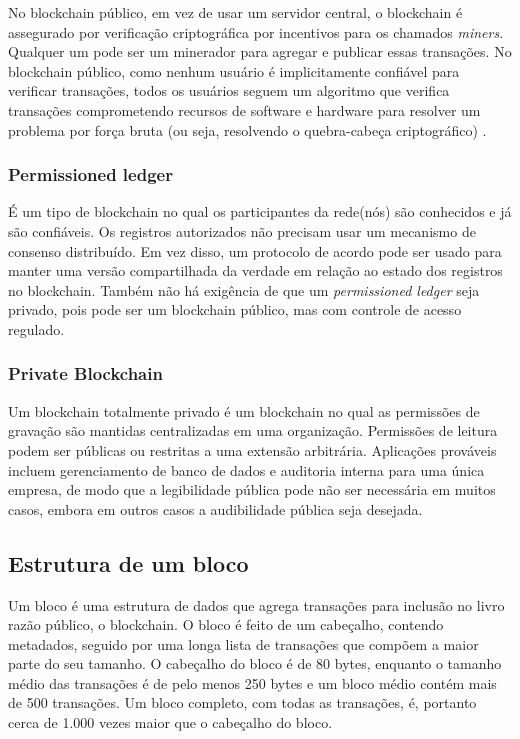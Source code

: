     No blockchain público, em vez de usar um servidor central, o blockchain é assegurado por verificação criptográfica por incentivos para os chamados \textit{miners}. Qualquer um pode ser um minerador para agregar e publicar essas transações. No blockchain público, como nenhum usuário é implicitamente confiável para verificar transações, todos os usuários seguem um algoritmo que verifica transações comprometendo recursos de software e hardware para resolver um problema por força bruta (ou seja, resolvendo o quebra-cabeça criptográfico) \cite{blockchain_pratical_guide}.
    

    \subsubsection{Permissioned ledger}
    
    É um tipo de blockchain no qual os participantes da rede(nós) são conhecidos e já são confiáveis. Os registros autorizados não precisam usar um mecanismo de consenso distribuído. Em vez disso, um protocolo de acordo pode ser usado para manter uma versão compartilhada da verdade em relação ao estado dos registros no blockchain. Também não há exigência de que um \textit{permissioned ledger} seja privado, pois pode ser um blockchain público, mas com controle de acesso regulado.\cite{mastering_blockchain}

    \subsubsection{Private Blockchain}

    Um blockchain totalmente privado é um blockchain no qual as permissões de gravação são mantidas centralizadas em uma organização. Permissões de leitura podem ser públicas ou restritas a uma extensão arbitrária. Aplicações prováveis incluem gerenciamento de banco de dados e auditoria interna para uma única empresa, de modo que a legibilidade pública pode não ser necessária em muitos casos, embora em outros casos a audibilidade pública seja desejada.\cite{blockchain_pratical_guide}



    \subsection{Estrutura de um bloco}

        Um bloco é uma estrutura de dados que agrega transações para inclusão no livro razão público, o blockchain. O bloco é feito de um cabeçalho, contendo metadados, seguido por uma longa lista de transações que compõem a maior parte do seu tamanho. O cabeçalho do bloco é de 80 bytes, enquanto o tamanho médio das transações é de pelo menos 250 bytes e um bloco médio contém mais de 500 transações. Um bloco completo, com todas as transações, é, portanto cerca de 1.000 vezes maior que o cabeçalho do bloco.\cite{mastering_blockchain_andreas}

